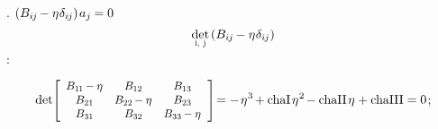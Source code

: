 \en{,}
.
${ ( B_{i\hspace{-0.1ex}j} \hspace{-0.15ex}
- \eta\hspace{.1ex} \delta_{i\hspace{-0.1ex}j} )
\hspace{.25ex} a_j \hspace{-0.1ex}
= 0 }$
\ru{,}
\begin{equation*}
\smash{%
   \underset{%
      \raisebox{.15em}{%
         \scalebox{.7}{ i, \hspace{.15ex}j }%
      } %
   } %
   { \operatorname{det} }%
} %
\hspace{.3ex}
( \somebivalenttensorcomponents{i\hspace{-0.1ex}j} \hspace{-0.15ex} - \eigenvalue \delta_{ i \hspace{-0.1ex} j } )
\end{equation*}
:

\nopagebreak\vspace{-0.1em}
\begin{equation}\label{chardetequation}
\operatorname{det} \hspace{-0.4ex}
\scalebox{.9}[.92]{$
   \left[
      \begin{array}{ccc}
         \somebivalenttensorcomponents{1\hspace{-0.1ex}1} \hspace{-0.16ex} - \eigenvalue & \somebivalenttensorcomponents{12} & \somebivalenttensorcomponents{13} \\
         \somebivalenttensorcomponents{21} & \somebivalenttensorcomponents{22} \hspace{-0.16ex} - \eigenvalue & \somebivalenttensorcomponents{23} \\
         \somebivalenttensorcomponents{31} & \somebivalenttensorcomponents{32} & \somebivalenttensorcomponents{33} \hspace{-0.16ex} - \eigenvalue
      \end{array}
   \hspace{.1ex}
   \right]
$} %
\hspace{-0.4ex} = - \hspace{.2ex}
\eigenvalue^3 \hspace{-0.25ex}
+ \firstcharacteristicinvariant \hspace{.25ex}
\eigenvalue^2 \hspace{-0.25ex}
- \secondcharacteristicinvariant \hspace{.25ex}
\eigenvalue
+ \thirdcharacteristicinvariant
= 0
\hspace{.2ex} ;
\end{equation}

